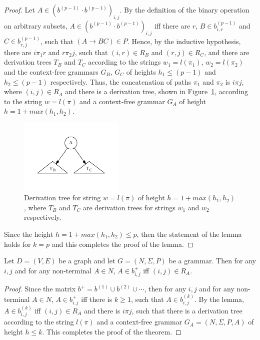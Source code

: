 \begin{proof}
Let $A \in (b^{(p-1)} \cdot b^{(p-1)})_{i,j}$. By the definition of the binary operation on arbitrary subsets, $A \in (b^{(p-1)} \cdot b^{(p-1)})_{i,j}$ iff there are $r$, $B \in b^{(p-1)}_{i,r}$ and $C \in b^{(p-1)}_{r,j}$, such that $(A \rightarrow B C) \in P$. Hence, by the inductive hypothesis, there are $i \pi_1 r$ and $r \pi_2 j$, such that $(i,r) \in R_B$ and $(r,j) \in R_C$, and there are derivation trees $T_B$ and $T_C$ according to the strings $w_1 = l(\pi_1)$, $w_2 = l(\pi_2)$ and the context-free grammars $G_B$, $G_C$ of heights $h_1 \leq (p-1)$ and $h_2 \leq (p-1)$ respectively. Thus, the concatenation of paths $\pi_1$ and $\pi_2$ is $i \pi j$, where $(i,j) \in R_A$ and there is a derivation tree, shown in Figure~\ref{tree2}, according to the string $w = l(\pi)$ and a context-free grammar $G_A$ of height $h = 1 + max(h_1, h_2)$.

\begin{figure}[h!]
 \centering
 \includegraphics[width=5cm]{pictures/tree2.pdf}
 \caption{Derivation tree for string $w = l(\pi)$ of height $h = 1 + max(h_1, h_2)$, where $T_B$ and $T_C$ are derivation trees for strings $w_1$ and $w_2$ respectively.}
 \label{tree2}
\end{figure}

Since the height $h = 1 + max(h_1, h_2) \leq p$, then the statement of the lemma holds for $k = p$ and this completes the proof of the lemma.
\end{proof}

\begin{mytheorem}\label{thm:correct}
 Let $D = (V,E)$ be a graph and let $G =(N,\Sigma,P)$ be a grammar. Then for any $i, j$ and for any non-terminal $A \in N$, $A \in b^+_{i,j}$ iff $(i,j) \in R_A$.
\end{mytheorem}
\begin{proof}

Since the matrix $b^+ = b^{(1)} \cup b^{(2)} \cup \cdots$, then for any $i, j$ and for any non-terminal $A \in N$, $A \in b^+_{i,j}$ iff there is $k \geq 1$, such that $A \in b^{(k)}_{i,j}$. By the lemma, $A \in b^{(k)}_{i,j}$ iff $(i,j) \in R_A$ and there is $i \pi j$, such that there is a derivation tree according to the string $l(\pi)$ and a context-free grammar $G_A = (N,\Sigma,P,A)$ of height $h \leq k$. This completes the proof of the theorem.
\end{proof}

